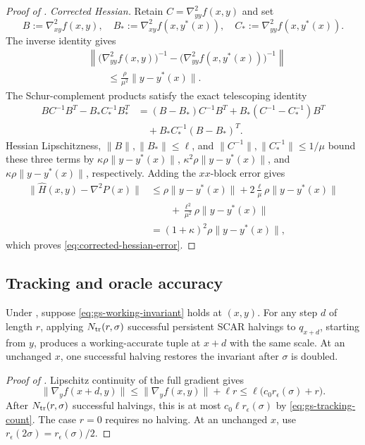 \documentclass{article}
\begin{document}
\begin{proof}[Proof of ]
\smallskip\noindent\emph{Corrected Hessian.}
Retain $C=\nabla^2_{yy}f(x,y)$ and set
\[
 B:=\nabla^2_{xy}f(x,y),\quad
 B_*:=\nabla^2_{xy}f(x,y^*(x)),\quad
 C_*:=\nabla^2_{yy}f(x,y^*(x)).
\]
The inverse identity gives
\[
\begin{aligned}
&\left\|
 \bigl(\nabla^2_{yy}f(x,y)\bigr)^{-1}
 -\bigl(\nabla^2_{yy}f(x,y^*(x))\bigr)^{-1}
 \right\|\\
&\qquad\le\frac{\rho}{\mu^2}\|y-y^*(x)\|.
\end{aligned}
\]
The Schur-complement products satisfy the exact telescoping identity
\begin{align*}
 BC^{-1}B^T-B_*C_*^{-1}B_*^T
 &=(B-B_*)C^{-1}B^T
   +B_*(C^{-1}-C_*^{-1})B^T\\
 &\quad+B_*C_*^{-1}(B-B_*)^T.
\end{align*}
Hessian Lipschitzness, $\|B\|,\|B_*\|\le\ell$, and
$\|C^{-1}\|,\|C_*^{-1}\|\le1/\mu$ bound these three terms by
$\kappa\rho\|y-y^*(x)\|$,
$\kappa^2\rho\|y-y^*(x)\|$, and
$\kappa\rho\|y-y^*(x)\|$, respectively.  Adding the
$xx$-block error gives
\begin{align*}
 \|\widehat H(x,y)-\nabla^2P(x)\|
 &\le \rho\|y-y^*(x)\|
 +2\frac\ell\mu\rho\|y-y^*(x)\|\\
 &\qquad
 +\frac{\ell^2}{\mu^2}\rho\|y-y^*(x)\|\\
 &=(1+\kappa)^2\rho\|y-y^*(x)\|,
\end{align*}
which proves \eqref{eq:corrected-hessian-error}.
\end{proof}


\subsection{Tracking and oracle accuracy}

\begin{lemma}
\label{lem:gs-tracking}
Under , suppose \eqref{eq:gs-working-invariant}
holds at $(x,y)$.  For any step $d$ of length $r$, applying
$N_{\rm tr}(r,\sigma)$ successful persistent SCAR halvings to
$q_{x+d}$, starting from $y$, produces a working-accurate tuple at
$x+d$ with the same scale.  At an unchanged $x$, one successful
halving restores the invariant after $\sigma$ is doubled.
\end{lemma}

\begin{proof}[Proof of ]
Lipschitz continuity of the full gradient gives
\[
 \|\nabla_yf(x+d,y)\|
 \le\|\nabla_yf(x,y)\|+\ell r
 \le\ell\bigl(c_0r_\epsilon(\sigma)+r\bigr).
\]
After $N_{\rm tr}(r,\sigma)$ successful halvings, this is at most
$c_0\ell r_\epsilon(\sigma)$ by \eqref{eq:gs-tracking-count}.
The case $r=0$ requires no halving.  At an unchanged $x$, use
$r_\epsilon(2\sigma)=r_\epsilon(\sigma)/2$.
\end{proof}
\end{document}

